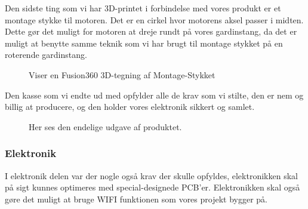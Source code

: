 \documentclass[11pt]{article}
\begin{document}
Den sidste ting som vi har 3D-printet i forbindelse med vores produkt er et montage stykke til motoren. Det er en cirkel hvor motorens aksel passer i midten. Dette gør det muligt for motoren at dreje rundt på vores gardinstang, da det er muligt at benytte samme teknik som vi har brugt til montage stykket på en roterende gardinstang.

\begin{figure}[htbp]
    \centering
    \caption{Viser en Fusion360 3D-tegning af Montage-Stykket}
    \end{figure}

Den kasse som vi endte ud med opfylder alle de krav som vi stilte, den er nem og billig at producere, og den holder vores elektronik sikkert og samlet. 

\begin{figure}[htbp]
    \centering
    \caption{Her ses den endelige udgave af produktet. }
    \end{figure}

\subsubsection{Elektronik}
I elektronik delen var der nogle også krav der skulle opfyldes, elektronikken skal på sigt kunnes optimeres med special-designede PCB'er. Elektronikken skal også gøre det muligt at bruge WIFI funktionen som vores projekt bygger på.
\end{document}
